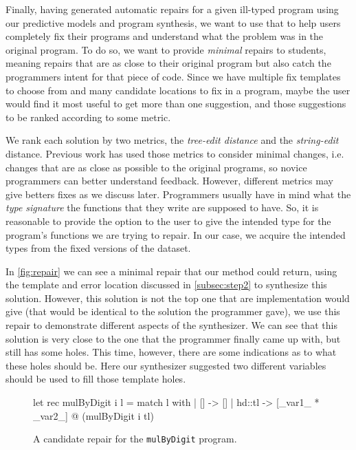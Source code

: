 Finally, having generated automatic repairs for a given ill-typed program using
our predictive models and program synthesis, we want to use that to help users
completely fix their programs and understand what the problem was in the
original program. To do so, we want to provide \emph{minimal} repairs to
students, meaning repairs that are as close to their original program but also
catch the programmers intent for that piece of code. Since we have multiple fix
templates to choose from and many candidate locations to fix in a program, maybe
the user would find it most useful to get more than one suggestion, and those
suggestions to be ranked according to some metric.

 We rank each solution by two metrics, the
\emph{tree-edit distance} and the \emph{string-edit} distance. Previous work has
used those metrics to consider minimal changes, i.e. changes that are as close
as possible to the original programs, so novice programmers can better
understand feedback. However, different metrics may give betters fixes as we
discuss later. Programmers usually have in mind what the \emph{type signature}
the functions that they write are supposed to have. So, it is reasonable to
provide the option to the user to give the intended type for the program's
functions we are trying to repair. In our case, we acquire the intended types
from the fixed versions of the dataset.

 In \autoref{fig:repair} we can see a minimal repair that our
method could return, using the template and error location discussed in
\autoref{subsec:step2} to synthesize this solution. However, this solution is
not the top one that are implementation would give (that would be identical to
the solution the programmer gave), we use this repair to demonstrate different
aspects of the synthesizer. We can see that this solution is very close to the
one that the programmer finally came up with, but still has some holes. This
time, however, there are some indications as to what these holes should be. Here
our synthesizer suggested two different variables should be used to fill those
template holes.

\begin{figure}[ht]
  \begin{ecode}
    let rec mulByDigit i l =
      match l with
      | []     -> []
      | hd::tl -> [_var1_ * _var2_] @ (mulByDigit i tl)
  \end{ecode}
  \caption{A candidate repair for the \texttt{mulByDigit} program.}
  \label{fig:repair}
\end{figure}
